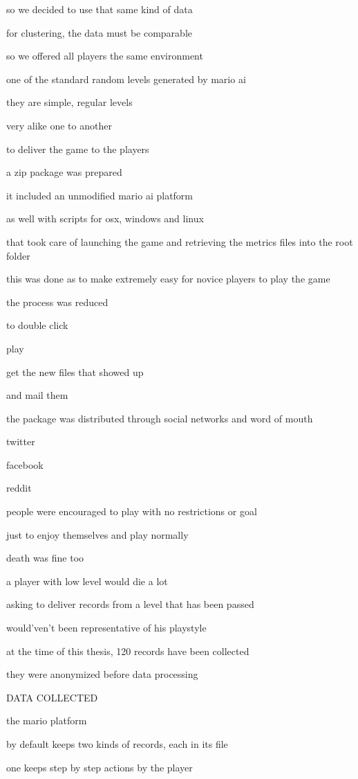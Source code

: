 so we decided to use that same kind of data

for clustering, the data must be comparable

so we offered all players the same environment

one of the standard random levels generated by mario ai

they are simple, regular levels

very alike one to another

to deliver the game to the players

a zip package was prepared

it included an unmodified mario ai platform

as well with scripts for osx, windows and linux

that took care of launching the game and retrieving the metrics files into the root folder

this was done as to make extremely easy for novice players to play the game

the process was reduced

to double click

play

get the new files that showed up

and mail them

the package was distributed through social networks and word of mouth

twitter

facebook

reddit

people were encouraged to play with no restrictions or goal

just to enjoy themselves and play normally

death was fine too

a player with low level would die a lot

asking to deliver records from a level that has been passed

would'ven't been representative of his playstyle

at the time of this thesis, 120 records have been collected

they were anonymized before data processing

DATA COLLECTED

the mario platform

by default keeps two kinds of records, each in its file

one keeps step by step actions by the player

